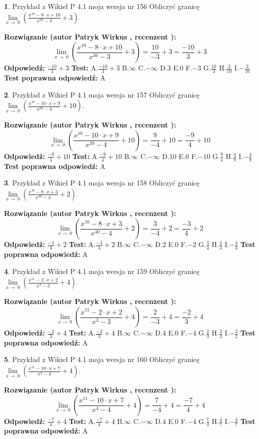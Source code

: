 \documentclass[12pt, a4paper]{article}
\theoremstyle{definition} %
\newtheorem{zad}{}
\newcommand{\zadStart}[1]{\begin{zad}#1\newline}
\newcommand{\zadStop}{\end{zad}}
\newcommand{\rozwStart}[2]{\noindent \textbf{Rozwiązanie (autor #1 , recenzent #2): }\newline}
\newcommand{\rozwStop}{\newline}
\newcommand{\odpStart}{\noindent \textbf{Odpowiedź:}\newline}
\newcommand{\odpStop}{\newline}
\newcommand{\testStart}{\noindent \textbf{Test:}\newline}
\newcommand{\testStop}{\newline}
\newcommand{\kluczStart}{\noindent \textbf{Test poprawna odpowiedź:}\newline}
\newcommand{\kluczStop}{\newline}
\begin{document}
\zadStart{Przykład z Wikieł P 4.1 moja wersja nr 156}
Obliczyć granicę $\lim\limits_{x\to\ 0}(\frac{x^{10}-8 \cdot x +10}{x^{36}-3}+3)$.
\zadStop
\rozwStart{Patryk Wirkus}{}
$$\lim\limits_{x\to\ 0}(\frac{x^{10}-8 \cdot x +10}{x^{36}-3}+3)=\frac{10}{-3}+3=\frac{-10}{3}+3$$
\rozwStop
\odpStart
$\frac{-10}{3}+3$
\odpStop
\testStart
A.$\frac{-10}{3}+3$
B.$\infty$
C.$-\infty$
D.$3$
E.$0$
F.$-3$
G.$\frac{10}{3}$
H.$\frac{3}{10}$
I.$-\frac{3}{10}$
\testStop
\kluczStart
A
\kluczStop



\zadStart{Przykład z Wikieł P 4.1 moja wersja nr 157}
Obliczyć granicę $\lim\limits_{x\to\ 0}(\frac{x^{10}-10 \cdot x +9}{x^{39}-4}+10)$.
\zadStop
\rozwStart{Patryk Wirkus}{}
$$\lim\limits_{x\to\ 0}(\frac{x^{10}-10 \cdot x +9}{x^{39}-4}+10)=\frac{9}{-4}+10=\frac{-9}{4}+10$$
\rozwStop
\odpStart
$\frac{-9}{4}+10$
\odpStop
\testStart
A.$\frac{-9}{4}+10$
B.$\infty$
C.$-\infty$
D.$10$
E.$0$
F.$-10$
G.$\frac{9}{4}$
H.$\frac{4}{9}$
I.$-\frac{4}{9}$
\testStop
\kluczStart
A
\kluczStop



\zadStart{Przykład z Wikieł P 4.1 moja wersja nr 158}
Obliczyć granicę $\lim\limits_{x\to\ 0}(\frac{x^{10}-8 \cdot x +3}{x^{40}-4}+2)$.
\zadStop
\rozwStart{Patryk Wirkus}{}
$$\lim\limits_{x\to\ 0}(\frac{x^{10}-8 \cdot x +3}{x^{40}-4}+2)=\frac{3}{-4}+2=\frac{-3}{4}+2$$
\rozwStop
\odpStart
$\frac{-3}{4}+2$
\odpStop
\testStart
A.$\frac{-3}{4}+2$
B.$\infty$
C.$-\infty$
D.$2$
E.$0$
F.$-2$
G.$\frac{3}{4}$
H.$\frac{4}{3}$
I.$-\frac{4}{3}$
\testStop
\kluczStart
A
\kluczStop



\zadStart{Przykład z Wikieł P 4.1 moja wersja nr 159}
Obliczyć granicę $\lim\limits_{x\to\ 0}(\frac{x^{11}-2 \cdot x +2}{x^{3}-3}+4)$.
\zadStop
\rozwStart{Patryk Wirkus}{}
$$\lim\limits_{x\to\ 0}(\frac{x^{11}-2 \cdot x +2}{x^{3}-3}+4)=\frac{2}{-3}+4=\frac{-2}{3}+4$$
\rozwStop
\odpStart
$\frac{-2}{3}+4$
\odpStop
\testStart
A.$\frac{-2}{3}+4$
B.$\infty$
C.$-\infty$
D.$4$
E.$0$
F.$-4$
G.$\frac{2}{3}$
H.$\frac{3}{2}$
I.$-\frac{3}{2}$
\testStop
\kluczStart
A
\kluczStop



\zadStart{Przykład z Wikieł P 4.1 moja wersja nr 160}
Obliczyć granicę $\lim\limits_{x\to\ 0}(\frac{x^{11}-10 \cdot x +7}{x^{4}-4}+4)$.
\zadStop
\rozwStart{Patryk Wirkus}{}
$$\lim\limits_{x\to\ 0}(\frac{x^{11}-10 \cdot x +7}{x^{4}-4}+4)=\frac{7}{-4}+4=\frac{-7}{4}+4$$
\rozwStop
\odpStart
$\frac{-7}{4}+4$
\odpStop
\testStart
A.$\frac{-7}{4}+4$
B.$\infty$
C.$-\infty$
D.$4$
E.$0$
F.$-4$
G.$\frac{7}{4}$
H.$\frac{4}{7}$
I.$-\frac{4}{7}$
\testStop
\kluczStart
A
\kluczStop
\end{document}
